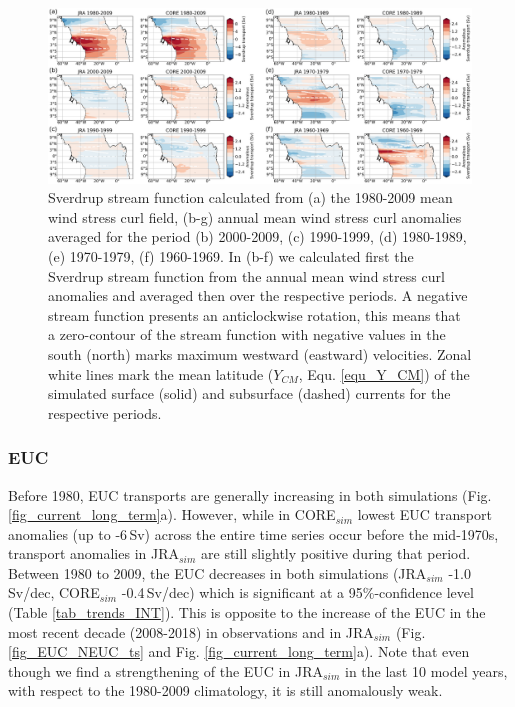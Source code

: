 \documentclass[os, manuscript]{copernicus}
\begin{document}
\begin{figure}[t]
	\includegraphics[width=12cm]{../../figures/paper/f09_SV_maps_decadal_anomalies.eps}
	\caption{Sverdrup stream function calculated from (a) the 1980-2009 mean wind stress curl field, (b-g) annual mean wind stress curl anomalies averaged for the period (b) 2000-2009, (c) 1990-1999, (d) 1980-1989, (e) 1970-1979, (f) 1960-1969. In (b-f) we calculated first the Sverdrup stream function from the annual mean wind stress curl anomalies and averaged then over the respective periods. A negative stream function presents an anticlockwise rotation, this means that a zero-contour of the stream function with negative values in the south (north) marks maximum westward (eastward) velocities. Zonal white lines mark the mean latitude ($ Y_{CM} $, Equ. \ref{equ_Y_CM}) of the simulated surface (solid) and subsurface (dashed) currents for the respective periods.}
	\label{fig_SV_long_term}
\end{figure}

\subsubsection{EUC}
Before 1980, EUC transports are generally increasing in both simulations (Fig. \ref{fig_current_long_term}a). However, while in CORE$_{sim}$ lowest EUC transport anomalies (up to -6$ \, $Sv) across the entire time series occur before the mid-1970s, transport anomalies in JRA$_{sim}$ are still slightly positive during that period. Between 1980 to 2009, the EUC decreases in both simulations (JRA$_{sim}$ -1.0$ \, $Sv/dec, CORE$_{sim}$ -0.4$ \, $Sv/dec) which is significant at a 95$ \% $-confidence level (Table \ref{tab_trends_INT}). This is opposite to the increase of the EUC in the most recent decade (2008-2018) in observations and in JRA$_{sim}$ (Fig. \ref{fig_EUC_NEUC_ts} and Fig. \ref{fig_current_long_term}a). Note that even though we find a strengthening of the EUC in JRA$_{sim}$ in the last 10 model years, with respect to the 1980-2009 climatology, it is still anomalously weak.  
\end{document}
